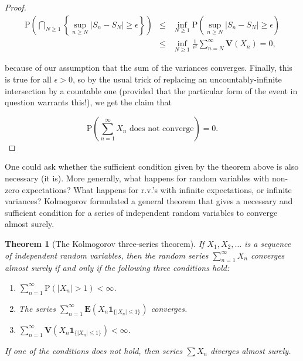 \documentclass[11pt]{report}
\theoremstyle{plain}
\newtheorem{thm}{Theorem}[chapter]
\theoremstyle{definition}
\begin{document}
\begin{proof}
\begin{eqnarray*}
\mathrm{P}\left( \bigcap_{N\ge 1} \left\{
\sup_{n\ge N}
|S_n-S_N|\ge\epsilon
\right\} \right) &\le& \inf_{N\ge 1}
\mathrm{P}\left(
\sup_{n\ge N}
|S_n-S_N|\ge\epsilon
\right) \\ &\le&
\inf_{N\ge 1} \frac{1}{\epsilon^2} \sum_{n=N}^\infty \mathbf{V}(X_n) = 0,
\end{eqnarray*}

\noindent because of our assumption that the sum of the
variances converges. Finally, this is true for all
$\epsilon>0$, so by the usual trick of replacing an
uncountably-infinite intersection by a countable one
(provided that the particular form of the event in
question warrants this!), we get the claim that

\[
\mathrm{P}\left(\sum_{n=1}^\infty X_n\textrm{ does not converge}\right) = 0.
\]

\end{proof}

\noindent One could ask whether the sufficient condition given
by the theorem above is also necessary (it is). More
generally, what happens for random variables with
non-zero expectations? What happens for r.v.'s with
infinite expectations, or infinite variances?
Kolmogorov formulated a general theorem that gives a
necessary and sufficient condition for a series of
independent random variables to converge almost
surely.

\begin{thm}[The Kolmogorov three-series theorem]
\label{thm-three-series}
If $X_1,X_2,\ldots$ is a sequence of independent
random variables, then the random series
$\sum_{n=1}^\infty X_n$ converges almost surely if
and only if the following three conditions hold:

\begin{enumerate}[label=\arabic*.]
\item $\sum_{n=1}^\infty \mathrm{P}(|X_n|>1) < \infty$.

\item The series
$\sum_{n=1}^\infty \mathbf{E}(X_n
\mathbf{1}_{\{|X_n|\le 1\}})$
converges.

\item $\sum_{n=1}^\infty \mathbf{V}(X_n \mathbf{1}_{\{|X_n|
\le 1\}}) < \infty$.
\end{enumerate}

\noindent If one of the conditions does not hold, then series
$\sum X_n$ diverges almost surely.
\end{thm}
\end{document}
